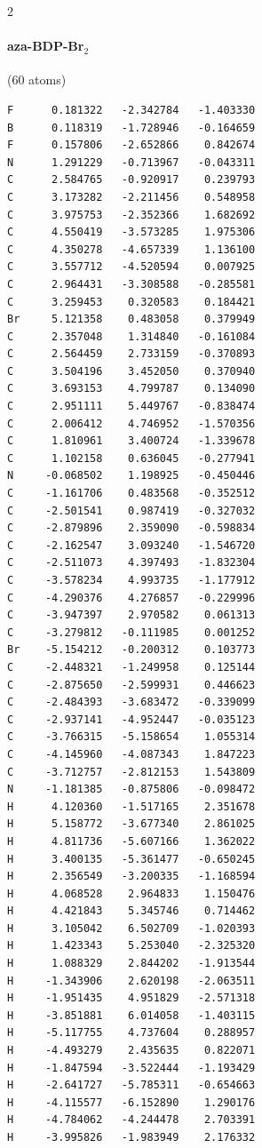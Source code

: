 \begin{multicols}{2}
\paragraph{aza-BDP-Br$_2$} (60 atoms)
{\scriptsize\linespread{1}\selectfont\begin{verbatim}
F      0.181322   -2.342784   -1.403330
B      0.118319   -1.728946   -0.164659
F      0.157806   -2.652866    0.842674
N      1.291229   -0.713967   -0.043311
C      2.584765   -0.920917    0.239793
C      3.173282   -2.211456    0.548958
C      3.975753   -2.352366    1.682692
C      4.550419   -3.573285    1.975306
C      4.350278   -4.657339    1.136100
C      3.557712   -4.520594    0.007925
C      2.964431   -3.308588   -0.285581
C      3.259453    0.320583    0.184421
Br     5.121358    0.483058    0.379949
C      2.357048    1.314840   -0.161084
C      2.564459    2.733159   -0.370893
C      3.504196    3.452050    0.370940
C      3.693153    4.799787    0.134090
C      2.951111    5.449767   -0.838474
C      2.006412    4.746952   -1.570356
C      1.810961    3.400724   -1.339678
C      1.102158    0.636045   -0.277941
N     -0.068502    1.198925   -0.450446
C     -1.161706    0.483568   -0.352512
C     -2.501541    0.987419   -0.327032
C     -2.879896    2.359090   -0.598834
C     -2.162547    3.093240   -1.546720
C     -2.511073    4.397493   -1.832304
C     -3.578234    4.993735   -1.177912
C     -4.290376    4.276857   -0.229996
C     -3.947397    2.970582    0.061313
C     -3.279812   -0.111985    0.001252
Br    -5.154212   -0.200312    0.103773
C     -2.448321   -1.249958    0.125144
C     -2.875650   -2.599931    0.446623
C     -2.484393   -3.683472   -0.339099
C     -2.937141   -4.952447   -0.035123
C     -3.766315   -5.158654    1.055314
C     -4.145960   -4.087343    1.847223
C     -3.712757   -2.812153    1.543809
N     -1.181385   -0.875806   -0.098472
H      4.120360   -1.517165    2.351678
H      5.158772   -3.677340    2.861025
H      4.811736   -5.607166    1.362022
H      3.400135   -5.361477   -0.650245
H      2.356549   -3.200335   -1.168594
H      4.068528    2.964833    1.150476
H      4.421843    5.345746    0.714462
H      3.105042    6.502709   -1.020393
H      1.423343    5.253040   -2.325320
H      1.088329    2.844202   -1.913544
H     -1.343906    2.620198   -2.063511
H     -1.951435    4.951829   -2.571318
H     -3.851881    6.014058   -1.403115
H     -5.117755    4.737604    0.288957
H     -4.493279    2.435635    0.822071
H     -1.847594   -3.522444   -1.193429
H     -2.641727   -5.785311   -0.654663
H     -4.115577   -6.152890    1.290176
H     -4.784062   -4.244478    2.703391
H     -3.995826   -1.983949    2.176332
\end{verbatim}}

\end{multicols}

